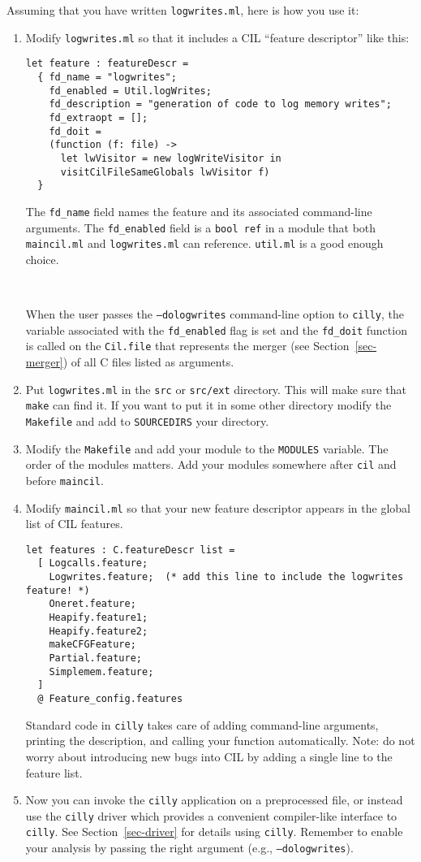\documentclass{article}
\def\secref#1{Section~\ref{sec-#1}}
\def\t#1{{\tt #1}}
\begin{document}
Assuming that you have written \t{logwrites.ml}, here is how you use it: 

 \begin{enumerate}

 \item Modify \t{logwrites.ml} so that it includes a CIL ``feature
 descriptor'' like this: 
\begin{verbatim}
let feature : featureDescr = 
  { fd_name = "logwrites";              
    fd_enabled = Util.logWrites;
    fd_description = "generation of code to log memory writes";
    fd_extraopt = [];
    fd_doit = 
    (function (f: file) -> 
      let lwVisitor = new logWriteVisitor in
      visitCilFileSameGlobals lwVisitor f)
  } 
\end{verbatim}
  The \t{fd\_name} field names the feature and its associated command-line
  arguments. The \t{fd\_enabled} field is a \t{bool ref} in a module that
  both \t{maincil.ml} and \t{logwrites.ml} can reference. \t{util.ml} is a
  good enough choice. 
  
  \ 
  
  When the user passes the \t{--dologwrites}
  command-line option to \t{cilly}, the variable associated with the
  \t{fd\_enabled} flag is set and the \t{fd\_doit} function is called
  on the \t{Cil.file} that represents the merger (see \secref{merger}) of
  all C files listed as arguments. 

 \item Put \t{logwrites.ml} in the \t{src} or \t{src/ext} directory. This
 will make sure that \t{make} can find it. If you want to put it in some
 other directory modify the \t{Makefile} and add to \t{SOURCEDIRS} your
 directory. 

 \item Modify the \t{Makefile} and add your module to the \t{MODULES}
 variable. The order of the modules matters. Add your modules somewhere after
 \t{cil} and before \t{maincil}.

 \item Modify \t{maincil.ml} so that your new feature descriptor appears in
 the global list of CIL features. 
\begin{verbatim}
let features : C.featureDescr list = 
  [ Logcalls.feature;
    Logwrites.feature;  (* add this line to include the logwrites feature! *)
    Oneret.feature;    
    Heapify.feature1;  
    Heapify.feature2;
    makeCFGFeature; 
    Partial.feature;
    Simplemem.feature;
  ] 
  @ Feature_config.features 
\end{verbatim}
 Standard code in \t{cilly} takes care of adding command-line arguments,
 printing the description, and calling your function automatically. 
 Note: do not worry about introducing new bugs into CIL by adding a single
 line to the feature list. 

 \item Now you can invoke the \t{cilly} application on a preprocessed file, or
 instead use the \t{cilly} driver which provides a convenient compiler-like
 interface to \t{cilly}. See \secref{driver} for details using \t{cilly}.
 Remember to enable your analysis by passing the right argument (e.g.,
 \t{--dologwrites}).   
 \end{enumerate}
\end{document}
